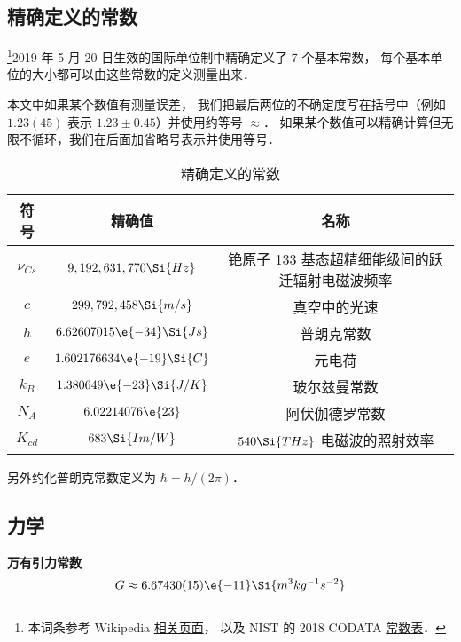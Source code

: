 

\subsection{精确定义的常数}
\footnote{本词条参考 Wikipedia \href{https://en.wikipedia.org/wiki/Physical_constant}{相关页面}， 以及 NIST 的 2018 CODATA \href{https://physics.nist.gov/cuu/Constants/Table/allascii.txt}{常数表}．}2019 年 5 月 20 日生效的国际单位制中精确定义了 7 个基本常数， 每个基本单位的大小都可以由这些常数的定义测量出来．

本文中如果某个数值有测量误差， 我们把最后两位的不确定度写在括号中（例如 $1.23(45)$ 表示 $1.23 \pm 0.45$）并使用约等号 $\approx$． 如果某个数值可以精确计算但无限不循环，我们在后面加省略号表示并使用等号．
\begin{table}[ht]
\centering
\caption{精确定义的常数}\label{Consts_tab1}
\begin{tabular}{|c|c|c|}
\hline
符号 & 精确值 & 名称 \\
\hline
$\nu_{Cs}$ & $9,192,631,770\Si{Hz}$ & 铯原子 133 基态超精细能级间的跃迁辐射电磁波频率 \\
\hline
$c$ & $299,792,458\Si{m/s}$ & 真空中的光速 \\
\hline
$h$ & $6.62607015\e{-34}\Si{Js}$ & 普朗克常数 \\
\hline
$e$ & $1.602176634\e{-19}\Si{C} $ & 元电荷 \\
\hline
$k_B$ & $1.380649\e{-23} \Si{J/K}$ & 玻尔兹曼常数 \\
\hline
$N_A$ & $6.02214076\e{23} $ & 阿伏伽德罗常数 \\
\hline
$K_{cd}$ & $683\Si{Im/W}$ & $540\Si{THz}$ 电磁波的照射效率 \\
\hline
\end{tabular}
\end{table}
另外约化普朗克常数定义为 $\hbar = h/(2\pi)$．


\subsection{力学}
\textbf{万有引力常数}
\begin{equation}
G \approx 6.67430(15)\e{-11} \Si{m^3 kg^{-1} s^{-2}}
\end{equation}

